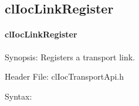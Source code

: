 \begin{flushleft}
\subsection{clIocLinkRegister}
\hypertarget{pageioc303}{}\paragraph{cl\-Ioc\-Link\-Register}\label{pageioc303}
\begin{Desc}
\item[Synopsis:]Registers a transport link.\end{Desc}
\begin{Desc}
\item[Header File:]clIocTransportApi.h\end{Desc}
\begin{Desc}
\item[Syntax:]


\end{Desc}
\end{flushleft}
